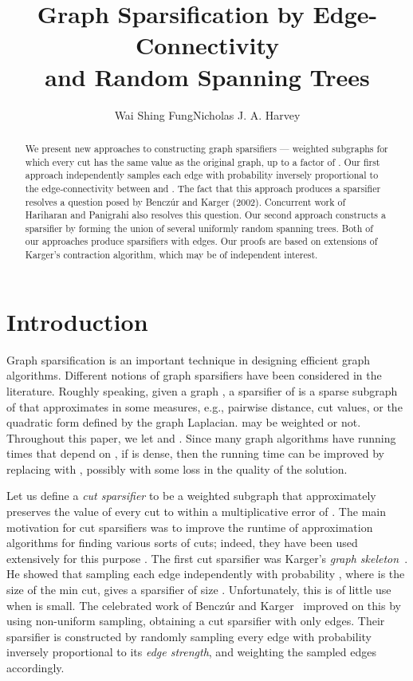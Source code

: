 \documentclass[11pt]{article}
\title{Graph Sparsification by Edge-Connectivity \\ and Random Spanning Trees}
\author{Wai Shing Fung\footnotemark[1] \qquad Nicholas J. A. Harvey\footnotemark[1]
}
\date{}
\numberwithin{equation}{section}
\renewcommand{\thefootnote}{\fnsymbol{footnote}}
\begin{document}
\maketitle
    \renewcommand{\thefootnote}{\fnsymbol{footnote}}
    \renewcommand{\thefootnote}{\arabic{footnote}}

\begin{abstract}
We present new approaches to constructing graph sparsifiers --- weighted subgraphs
for which every cut has the same value as the original graph, up to a factor of .
Our first approach independently samples each edge  with probability
inversely proportional to the edge-connectivity between  and .
The fact that this approach produces a sparsifier resolves a question
posed by Bencz\'ur and Karger (2002).
Concurrent work of Hariharan and Panigrahi also resolves this question.
Our second approach constructs a sparsifier by forming the union 
of several uniformly random spanning trees.
Both of our approaches produce sparsifiers with  edges.
Our proofs are based on extensions of Karger's contraction algorithm,
which may be of independent interest.
\end{abstract}



\section{Introduction}

Graph sparsification is an important technique in designing efficient graph algorithms.
Different notions of graph sparsifiers have been considered in the literature.
Roughly speaking, given a graph , a sparsifier  of 
is a sparse subgraph of  that approximates  in some measures, 
e.g., pairwise distance, cut values,
or the quadratic form defined by the graph Laplacian.
 may be weighted or not.
Throughout this paper, we let  and .
Since many graph algorithms have running times that depend on ,
if  is dense, then the running time can be improved by replacing  with ,
possibly with some loss in the quality of the solution.

Let us define a \textit{cut sparsifier} to be a weighted subgraph that
approximately preserves the value of every cut to within a multiplicative error of .
The main motivation for cut sparsifiers was to improve the runtime of
approximation algorithms for finding various sorts of cuts;
indeed, they have been used extensively for this purpose \cite{KargerSkel,BKConf,AK,KRV}.
The first cut sparsifier was Karger's \textit{graph skeleton}~\cite{KargerSkelConf,KargerSkel}.
He showed that sampling each edge independently with probability ,
where  is the size of the min cut, gives a sparsifier of size .
Unfortunately, this is of little use when  is small.
The celebrated work of Bencz\'ur and Karger~\cite{BKConf,BK} 
improved on this by using non-uniform sampling,
obtaining a cut sparsifier with only  edges.
Their sparsifier is constructed by randomly sampling every edge with probability
inversely proportional to its \emph{edge strength},
and weighting the sampled edges accordingly.
\end{document}
